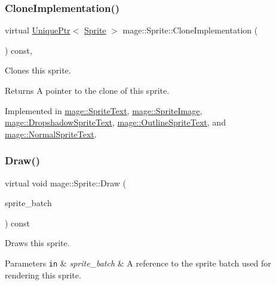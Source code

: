 \subsubsection{\texorpdfstring{Clone\+Implementation()}{CloneImplementation()}}
{\footnotesize\ttfamily virtual \hyperlink{namespacemage_a3316d7143a973e37adf1110f2e80ca31}{Unique\+Ptr}$<$ \hyperlink{classmage_1_1_sprite}{Sprite} $>$ mage\+::\+Sprite\+::\+Clone\+Implementation (\begin{DoxyParamCaption}{ }\end{DoxyParamCaption}) const\hspace{0.3cm}{\ttfamily [private]}, {}}

Clones this sprite.

\begin{DoxyReturn}{Returns}
A pointer to the clone of this sprite. 
\end{DoxyReturn}


Implemented in \hyperlink{classmage_1_1_sprite_text_aa2c63346f5ad7f63f7a6d474df3556ef}{mage\+::\+Sprite\+Text}, \hyperlink{classmage_1_1_sprite_image_ad6460971fc4ffb425b7a43d27c9b05b2}{mage\+::\+Sprite\+Image}, \hyperlink{classmage_1_1_dropshadow_sprite_text_af997217dd243061e0490bbcd4bfde7ed}{mage\+::\+Dropshadow\+Sprite\+Text}, \hyperlink{classmage_1_1_outline_sprite_text_ac1fcc7e91b972b250e09fbb8d62f908d}{mage\+::\+Outline\+Sprite\+Text}, and \hyperlink{classmage_1_1_normal_sprite_text_acab5b61f8be4a475cd54b51278956e37}{mage\+::\+Normal\+Sprite\+Text}.

\hypertarget{classmage_1_1_sprite_a954a9f2046edcd6b1658a236ae23ec5a}{}\label{classmage_1_1_sprite_a954a9f2046edcd6b1658a236ae23ec5a} 
\subsubsection{\texorpdfstring{Draw()}{Draw()}}
{\footnotesize\ttfamily virtual void mage\+::\+Sprite\+::\+Draw (\begin{DoxyParamCaption}\item[{\hyperlink{classmage_1_1_sprite_batch}{Sprite\+Batch} \&}]{sprite\+\_\+batch }\end{DoxyParamCaption}) const\hspace{0.3cm}{\ttfamily [pure virtual]}}

Draws this sprite.


\begin{DoxyParams}[1]{Parameters}
\mbox{\tt in}  & {\em sprite\+\_\+batch} & A reference to the sprite batch used for rendering this sprite. \\
\hline
\end{DoxyParams}


